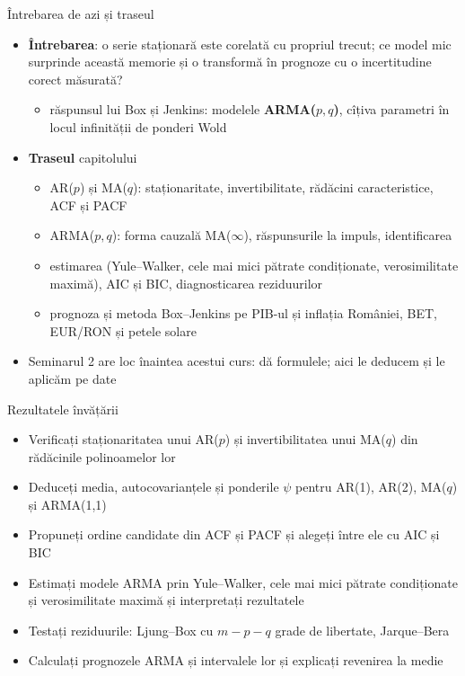 \begin{frame}{Întrebarea de azi și traseul}
\itemsize{\small}
\begin{itemize}
    \item \textbf{Întrebarea}: o serie staționară este corelată cu propriul trecut; ce model mic surprinde această memorie și o transformă în prognoze cu o incertitudine corect măsurată?
    \begin{itemize}
        \item răspunsul lui Box și Jenkins: modelele \textbf{ARMA($p,q$)}, cîțiva parametri în locul infinității de ponderi Wold
    \end{itemize}
    \item \textbf{Traseul} capitolului
    \begin{itemize}
        \item AR($p$) și MA($q$): staționaritate, invertibilitate, rădăcini caracteristice, ACF și PACF
        \item ARMA($p,q$): forma cauzală MA($\infty$), răspunsurile la impuls, identificarea
        \item estimarea (Yule--Walker, cele mai mici pătrate condiționate, verosimilitate maximă), AIC și BIC, diagnosticarea reziduurilor
        \item prognoza și metoda Box--Jenkins pe PIB-ul și inflația României, BET, EUR/RON și petele solare
    \end{itemize}
    \item Seminarul 2 are loc înaintea acestui curs: dă formulele; aici le deducem și le aplicăm pe date
\end{itemize}
\end{frame}

\begin{frame}{Rezultatele învățării}
\itemsize{\small}
\begin{itemize}
    \item Verificați staționaritatea unui AR($p$) și invertibilitatea unui MA($q$) din rădăcinile polinoamelor lor
    \item Deduceți media, autocovarianțele și ponderile $\psi$ pentru AR(1), AR(2), MA($q$) și ARMA(1,1)
    \item Propuneți ordine candidate din ACF și PACF și alegeți între ele cu AIC și BIC
    \item Estimați modele ARMA prin Yule--Walker, cele mai mici pătrate condiționate și verosimilitate maximă și interpretați rezultatele
    \item Testați reziduurile: Ljung--Box cu $m - p - q$ grade de libertate, Jarque--Bera
    \item Calculați prognozele ARMA și intervalele lor și explicați revenirea la medie
\end{itemize}
\end{frame}

